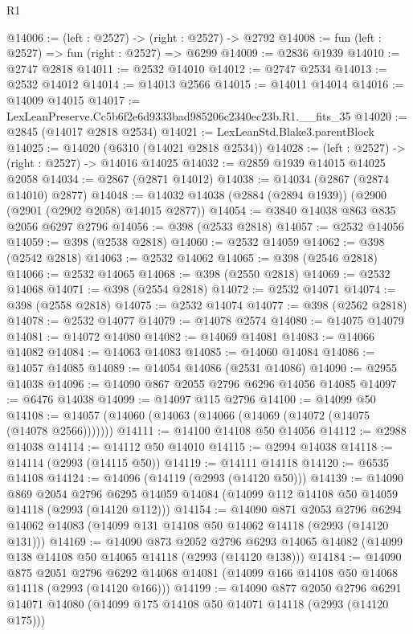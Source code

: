 \begin{lexlean}{R1}
\begin{coremodule}
@14006 := (left : @2527) -> (right : @2527) -> @2792
@14008 := fun (left : @2527) => fun (right : @2527) => @6299
@14009 := @2836 @1939
@14010 := @2747 @2818
@14011 := @2532 @14010
@14012 := @2747 @2534
@14013 := @2532 @14012
@14014 := @14013 @2566
@14015 := @14011 @14014
@14016 := @14009 @14015
@14017 := LexLeanPreserve.Cc5b6f2e6d9333bad985206c2340ec23b.R1.__fits_35
@14020 := @2845 (@14017 @2818 @2534)
@14021 := LexLeanStd.Blake3.parentBlock
@14025 := @14020 (@6310 (@14021 @2818 @2534))
@14028 := (left : @2527) -> (right : @2527) -> @14016 @14025
@14032 := @2859 @1939 @14015 @14025 @2058
@14034 := @2867 (@2871 @14012)
@14038 := @14034 (@2867 (@2874 @14010) @2877)
@14048 := @14032 @14038 (@2884 (@2894 @1939)) (@2900 (@2901 (@2902 @2058) @14015 @2877))
@14054 := @3840 @14038 @863 @835 @2056 @6297 @2796
@14056 := @398 (@2533 @2818)
@14057 := @2532 @14056
@14059 := @398 (@2538 @2818)
@14060 := @2532 @14059
@14062 := @398 (@2542 @2818)
@14063 := @2532 @14062
@14065 := @398 (@2546 @2818)
@14066 := @2532 @14065
@14068 := @398 (@2550 @2818)
@14069 := @2532 @14068
@14071 := @398 (@2554 @2818)
@14072 := @2532 @14071
@14074 := @398 (@2558 @2818)
@14075 := @2532 @14074
@14077 := @398 (@2562 @2818)
@14078 := @2532 @14077
@14079 := @14078 @2574
@14080 := @14075 @14079
@14081 := @14072 @14080
@14082 := @14069 @14081
@14083 := @14066 @14082
@14084 := @14063 @14083
@14085 := @14060 @14084
@14086 := @14057 @14085
@14089 := @14054 @14086 (@2531 @14086)
@14090 := @2955 @14038
@14096 := @14090 @867 @2055 @2796 @6296 @14056 @14085
@14097 := @6476 @14038
@14099 := @14097 @115 @2796
@14100 := @14099 @50
@14108 := @14057 (@14060 (@14063 (@14066 (@14069 (@14072 (@14075 (@14078 @2566)))))))
@14111 := @14100 @14108 @50 @14056
@14112 := @2988 @14038
@14114 := @14112 @50 @14010
@14115 := @2994 @14038
@14118 := @14114 (@2993 (@14115 @50))
@14119 := @14111 @14118
@14120 := @6535 @14108
@14124 := @14096 (@14119 (@2993 (@14120 @50)))
@14139 := @14090
    @869
    @2054
    @2796
    @6295
    @14059
    @14084
    (@14099 @112 @14108 @50 @14059 @14118 (@2993 (@14120 @112)))
@14154 := @14090
    @871
    @2053
    @2796
    @6294
    @14062
    @14083
    (@14099 @131 @14108 @50 @14062 @14118 (@2993 (@14120 @131)))
@14169 := @14090
    @873
    @2052
    @2796
    @6293
    @14065
    @14082
    (@14099 @138 @14108 @50 @14065 @14118 (@2993 (@14120 @138)))
@14184 := @14090
    @875
    @2051
    @2796
    @6292
    @14068
    @14081
    (@14099 @166 @14108 @50 @14068 @14118 (@2993 (@14120 @166)))
@14199 := @14090
    @877
    @2050
    @2796
    @6291
    @14071
    @14080
    (@14099 @175 @14108 @50 @14071 @14118 (@2993 (@14120 @175)))

\end{coremodule}
\end{lexlean}
